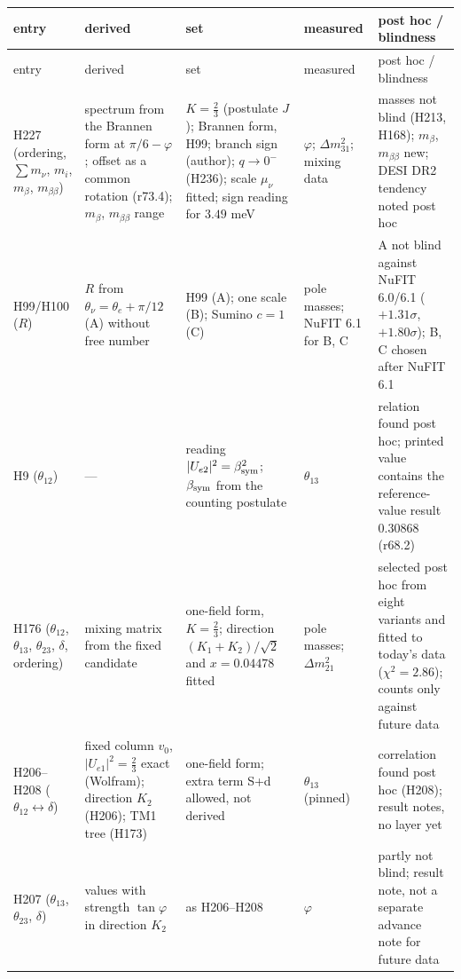 {\small
\begin{longtable}{@{}>{\raggedright\arraybackslash}p{}>{\raggedright\arraybackslash}p{}>{\raggedright\arraybackslash}p{}>{\raggedright\arraybackslash}p{}>{\raggedright\arraybackslash}p{}@{}}
\toprule
entry & derived & set & measured & post hoc / blindness\\
\midrule
\endfirsthead
\toprule
entry & derived & set & measured & post hoc / blindness\\
\midrule
\endhead
\bottomrule
\endfoot
H227 (ordering, \(\sum m_\nu\), \(m_i\), \(m_\beta\), \(m_{\beta\beta}\)) & spectrum from the Brannen form at \(\pi/6-\varphi\); offset as a common rotation (r73.4); \(m_\beta\), \(m_{\beta\beta}\) range & \(K=\tfrac23\) (postulate \(J\)); Brannen form, H99; branch sign (author); \(q\to0^-\) (H236); scale \(\mu_\nu\) fitted; sign reading for \(3.49\) meV & \(\varphi\); \(\Delta m^2_{31}\); mixing data & masses not blind (H213, H168); \(m_\beta\), \(m_{\beta\beta}\) new; DESI DR2 tendency noted post hoc\\
H99/H100 (\(R\)) & \(R\) from \(\theta_\nu=\theta_e+\pi/12\) (A) without free number & H99 (A); one scale (B); Sumino \(c=1\) (C) & pole masses; NuFIT 6.1 for B, C & A not blind against NuFIT 6.0/6.1 (\(+1.31\sigma\), \(+1.80\sigma\)); B, C chosen after NuFIT 6.1\\
H9 (\(\theta_{12}\)) & --- & reading \(|U_{e2}|^2=\beta_{\rm sym}^2\); \(\beta_{\rm sym}\) from the counting postulate & \(\theta_{13}\) & relation found post hoc; printed value contains the reference-value result \(0.30868\) (r68.2)\\
H176 (\(\theta_{12}\), \(\theta_{13}\), \(\theta_{23}\), \(\delta\), ordering) & mixing matrix from the fixed candidate & one-field form, \(K=\tfrac23\); direction \((K_1+K_2)/\sqrt2\) and \(x=0.04478\) fitted & pole masses; \(\Delta m^2_{21}\) & selected post hoc from eight variants and fitted to today's data (\(\chi^2=2.86\)); counts only against future data\\
H206--H208 (\(\theta_{12}\leftrightarrow\delta\)) & fixed column \(v_0\), \(|U_{e1}|^2=\tfrac23\) exact (Wolfram); direction \(K_2\) (H206); TM1 tree (H173) & one-field form; extra term S+d allowed, not derived & \(\theta_{13}\) (pinned) & correlation found post hoc (H208); result notes, no layer yet\\
H207 (\(\theta_{13}\), \(\theta_{23}\), \(\delta\)) & values with strength \(\tan\varphi\) in direction \(K_2\) & as H206--H208 & \(\varphi\) & partly not blind; result note, not a separate advance note for future data\\

\end{longtable}}
